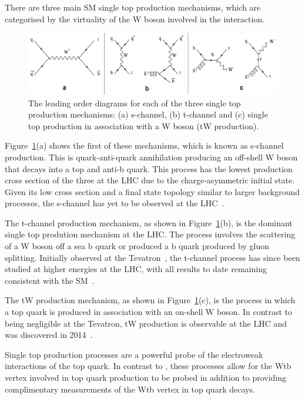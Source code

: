 There are three main SM single top production mechanisms, which are categorised by the virtuality of the W boson involved in the interaction.

\begin{figure}[htbp]
\centering
\includegraphics[width=1.00\textwidth]{figs/top-physics/singletop_feyn.jpg}
\caption{The leading order diagrams for each of the three single top production mechanisms: (a) s-channel, (b) t-channel and (c) single top production in association with a W boson (tW production).}
\label{fig:singleTopDiagrams}
\end{figure}

Figure~\ref{fig:singleTopDiagrams}(a) shows the first of these mechanisms, which is known as s-channel production. 
This is quark-anti-quark annihilation producing an off-shell W boson that decays into a top and anti-b quark.
This process has the lowest production cross section of the three at the LHC due to the charge-asymmetric initial state.
Given its low cross section and a final state topology similar to larger background processes, the s-channel has yet to be observed at the LHC~\cite{Khachatryan:2016ewo}.

The t-channel production mechanism, as shown in Figure~\ref{fig:singleTopDiagrams}(b), is the dominant single top prodution mechanism at the LHC.
The process involves the scattering of a W boson off a sea b quark or produced a b quark produced by gluon splitting.
Initially observed at the Tevatron~\cite{Aaltonen:2009jj,Abazov:2009ii}, the t-channel process has since been studied at higher energies at the LHC, with all results to date remaining consistent with the SM~\cite{Berta:2017ghf,Morton:2018wkb}.	

The tW production mechanism, as shown in Figure~\ref{fig:singleTopDiagrams}(c), is the process in which  a top quark is produced in association with an on-shell W boson.
In contrast to being negligible at the Tevatron, tW production is observable at the LHC and was discovered in 2014~\cite{Chatrchyan:2014tua}.

Single top production processes are a powerful probe of the electroweak interactions of the top quark.
In contrast to \ttbar, these processes allow for the Wtb vertex involved in top quark production to be probed in addition to providing complimentary measurements of the Wtb vertex in top quark decays.


